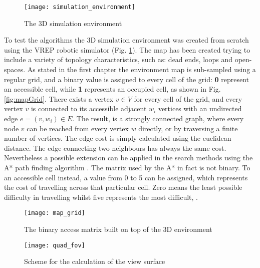 \begin{figure}[H]
\centering
\texttt{[image: simulation\_environment]}
\caption{The 3D simulation environment}
\label{fig:simEnv}
\end{figure}


To test the algorithms the 3D simulation environment was created from scratch using the VREP robotic simulator (Fig. \ref{fig:simEnv}). The map has been created trying to include a variety of topology characteristics, such as: dead ends, loops and open-spaces.
As stated in the first chapter the environment map is sub-sampled using a regular grid, and a binary value is assigned to every cell of the grid: \textbf{0} represent an accessible cell, while \textbf{1} represents an occupied cell, as shown in Fig. \ref{fig:mapGrid}.  There exists a vertex $v \in V$ for every cell of the grid, and every vertex $v$ is connected to its accessible adjacent $w_i$ vertices with an undirected edge $e=(v,w_i) \in E$. The result, is a strongly connected graph, where every node $v$ can be reached from every vertex $w$ directly, or by traversing a finite number of vertices. The edge cost is simply calculated using the euclidean distance. The edge connecting two neighbours has always the same cost. Nevertheless a possible extension can be applied in the search methods using the A* path finding algorithm \cite{4082128}. The matrix used by the A* in fact is not binary. To an accessible cell instead, a value from 0 to 5 can be assigned, which represents the cost of travelling across that particular cell. Zero means the least possible difficulty in travelling whilst five represents the most difficult, .



\begin{figure}[H]
  \begin{minipage}[b]{0.45\linewidth}
    \centering
\texttt{[image: map\_grid]}
\caption{The binary access matrix built on top of the 3D environment}
\label{fig:mapGrid}
  \end{minipage}
\quad
  \begin{minipage}[b]{0.45\linewidth}
    \centering
\texttt{[image: quad\_fov]}
\caption{Scheme for the calculation of the view surface}
\label{fig:quadFov}
  \end{minipage}
\end{figure}

